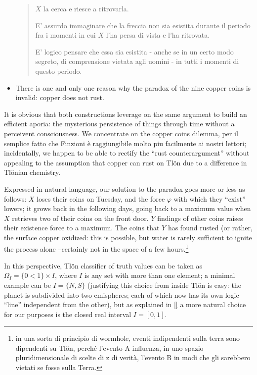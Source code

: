 \begin{example}
\begin{itemize}
\begin{quote}
    $X$ la cerca e riesce a ritrovarla.
    
    E' assurdo immaginare che la freccia non sia esistita durante il periodo fra i momenti in cui $X$ l'ha persa di vista e l'ha ritrovata.
    
    E' logico pensare che essa sia esistita - anche se in un certo modo segreto, di comprensione vietata agli uomini - in tutti i momenti di questo periodo.
\end{quote}
    \item There is one and only one reason why the paradox of the nine copper coins is invalid: copper does not rust.
  \end{itemize}
  It is obvious that both constructions leverage on the same argument to build an efficient aporia: the mysterious persistence of things through time without a perceivent consciousness. We concentrate on the copper coins dilemma, per il semplice fatto che Finzioni è raggiungibile molto piu facilmente ai nostri lettori; incidentally, we happen to be able to rectify the ``rust counterargument'' without appealing to the assumption that copper can rust on Tl\"on due to a difference in Tl\"onian chemistry.

  Expressed in natural language, our solution to the paradox goes more or less as follows: $X$ loses their coins on Tuesday, and the force $\varphi$ with which they ``exist'' lowers; it grows back in the following days, going back to a maximum value when $X$ retrieves two of their coins on the front door. $Y$ findings of other coins raises their existence force to a maximum. The coins that $Y$ has found rusted (or rather, the surface copper oxidized: this is possible, but water is rarely sufficient to ignite the process alone --certainly not in the space of a few hours.\footnote{in una sorta di principio di wormhole, eventi indipendenti sulla terra sono dipendenti su Tlön, perché l'evento A influenza, in uno spazio pluridimensionale di scelte di z di verità, l'evento B in modi che gli sarebbero vietati se fosse sulla Terra.} 
  
  In this perspective, Tl\"on classifier of truth values can be taken as $\Omega_I = \{0<1\}\times I$, where $I$ is any set with more than one element; a minimal example can be $I=\{N,S\}$ (justifying this choice from inside Tl\"on is easy: the planet is subdivided into two emispheres; each of which now has its own logic ``line'' independent from the other), but as explained in \ref{} a more natural choice for our purposes is the closed real interval $I=[0,1]$.
  

\end{example}
